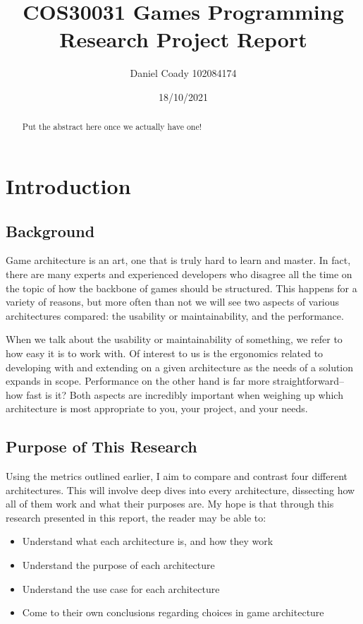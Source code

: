 \documentclass{article}
\title{COS30031 Games Programming\\Research Project Report}
\author{Daniel Coady 102084174}
\date{18/10/2021}
\begin{document}
\maketitle

\pagebreak

\tableofcontents

\pagebreak

\begin{abstract}
    Put the abstract here once we actually have one!
\end{abstract}

\section{Introduction}
\subsection{Background}
Game architecture is an art, one that is truly hard to learn and master. In
fact, there are many experts and experienced developers who disagree all the
time on the topic of how the backbone of games should be structured. This
happens for a variety of reasons, but more often than not we will see two
aspects of various architectures compared: the usability or maintainability, and
the performance.

When we talk about the usability or maintainability of something, we refer to
how easy it is to work with. Of interest to us is the ergonomics related to
developing with and extending on a given architecture as the needs of a solution
expands in scope. Performance on the other hand is far more straightforward--how
fast is it? Both aspects are incredibly important when weighing up which
architecture is most appropriate to you, your project, and your needs.

\subsection{Purpose of This Research}
Using the metrics outlined earlier, I aim to compare and contrast four different
architectures. This will involve deep dives into every architecture, dissecting
how all of them work and what their purposes are. My hope is that through this
research presented in this report, the reader may be able to:

\begin{itemize}
    \item Understand what each architecture is, and how they work
    \item Understand the purpose of each architecture
    \item Understand the use case for each architecture
    \item Come to their own conclusions regarding choices in game architecture
\end{itemize}
\end{document}
